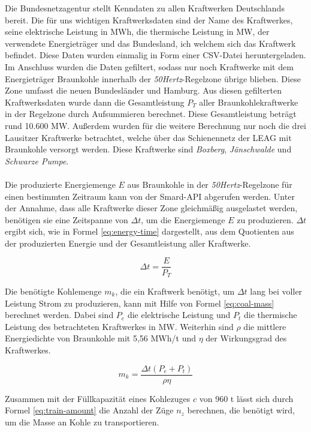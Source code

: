 Die Bundesnetzagentur stellt Kenndaten zu allen Kraftwerken Deutschlands bereit\cite{noauthor_bundesnetzagentur_nodate}. Die für uns wichtigen Kraftwerksdaten sind der Name des Kraftwerkes, seine elektrische Leistung in MWh, die thermische Leistung in MW, der verwendete Energieträger und das Bundesland, ich welchem sich das Kraftwerk befindet. Diese Daten wurden einmalig in Form einer CSV-Datei heruntergeladen. Im Anschluss wurden die Daten gefiltert, sodass nur noch Kraftwerke mit dem Energieträger Braunkohle innerhalb der \emph{50Hertz}-Regelzone übrige blieben. Diese Zone umfasst die neuen Bundesländer und Hamburg. Aus diesen gefilterten Kraftwerksdaten wurde dann die Gesamtleistung $P_T$ aller Braunkohlekraftwerke in der Regelzone durch Aufsummieren berechnet. Diese Gesamtleistung beträgt rund 10.600 MW. Außerdem wurden für die weitere Berechnung nur noch die drei Lausitzer Kraftwerke betrachtet, welche über das Schienennetz der LEAG mit Braunkohle versorgt werden. Diese Kraftwerke sind \emph{Boxberg}, \emph{Jänschwalde} und \emph{Schwarze Pumpe}.\\
\\
Die produzierte Energiemenge $E$ aus Braunkohle in der \emph{50Hertz}-Regelzone für einen bestimmten Zeitraum kann von der Smard-API abgerufen werden. Unter der Annahme, dass alle Kraftwerke dieser Zone gleichmäßig ausgelastet werden, benötigen sie eine Zeitspanne von $\Delta t$, um die Energiemenge $E$ zu produzieren. $\Delta t$ ergibt sich, wie in Formel \ref{eq:energy-time} dargestellt, aus dem Quotienten aus der produzierten Energie und der Gesamtleistung aller Kraftwerke.

\begin{equation}
    \Delta t = \frac{E}{P_T}\label{eq:energy-time}
\end{equation}

Die benötigte Kohlemenge $m_k$, die ein Kraftwerk benötigt, um $\Delta t$ lang bei voller Leistung Strom zu produzieren, kann mit Hilfe von Formel \ref{eq:coal-mass} berechnet werden. Dabei sind $P_e$ die elektrische Leistung und $P_t$ die thermische Leistung des betrachteten Kraftwerkes in MW. Weiterhin sind $\rho$ die mittlere Energiedichte von Braunkohle mit 5,56 MWh/t \cite{paschotta_kohle_2023} und $\eta$ der Wirkungsgrad des Kraftwerkes.

\begin{equation}
    m_k=\frac{\Delta t(P_e+P_t)}{\rho\eta}\label{eq:coal-mass}
\end{equation}

Zusammen mit der Füllkapazität eines Kohlezuges $c$ von 960 t lässt sich durch Formel \ref{eq:train-amount} die Anzahl der Züge $n_z$ berechnen, die benötigt wird, um die Masse an Kohle zu transportieren.


